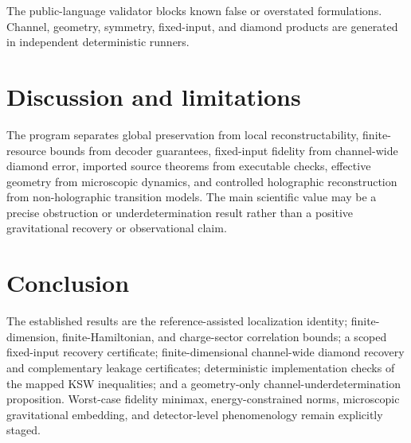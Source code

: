 \documentclass[11pt]{article}
\begin{document}
The public-language validator blocks known false or overstated formulations. Channel, geometry, symmetry, fixed-input, and diamond products are generated in independent deterministic runners.

\section{Discussion and limitations}
\label{sec:discussion}

The program separates global preservation from local reconstructability, finite-resource bounds from decoder guarantees, fixed-input fidelity from channel-wide diamond error, imported source theorems from executable checks, effective geometry from microscopic dynamics, and controlled holographic reconstruction from non-holographic transition models. The main scientific value may be a precise obstruction or underdetermination result rather than a positive gravitational recovery or observational claim.

\section{Conclusion}
\label{sec:conclusion}

The established results are the reference-assisted localization identity; finite-dimension, finite-Hamiltonian, and charge-sector correlation bounds; a scoped fixed-input recovery certificate; finite-dimensional channel-wide diamond recovery and complementary leakage certificates; deterministic implementation checks of the mapped KSW inequalities; and a geometry-only channel-underdetermination proposition. Worst-case fidelity minimax, energy-constrained norms, microscopic gravitational embedding, and detector-level phenomenology remain explicitly staged.



\end{document}
